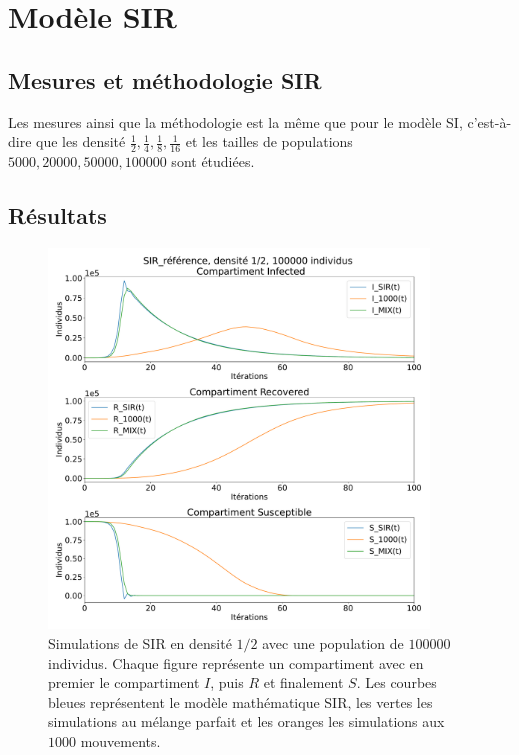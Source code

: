 \chapter{Modèle SIR} \label{ch:SIR}

\section{Mesures et méthodologie SIR}

Les mesures ainsi que la méthodologie est la même que pour le modèle SI, c'est-à-dire que les densité $\frac{1}{2},\frac{1}{4},\frac{1}{8},\frac{1}{16}$ et les tailles de populations $5000,20000,50000,100000$ sont étudiées.

\newpage

\section{Résultats}

\begin{figure}[h]
	\centering
	\captionsetup{justification=centering}
	\includegraphics[width=0.9\textwidth]{Images/SIR_ref_2_100.pdf}
	\caption[Simulation SIR, densité $1/2$]{Simulations de SIR en densité $1/2$ avec une population de $100000$ individus. Chaque figure représente un compartiment avec en premier le compartiment $I$, puis $R$ et finalement $S$. Les courbes bleues représentent le modèle mathématique SIR, les vertes les simulations au mélange parfait et les oranges les simulations aux $1000$ mouvements.}
\end{figure}

